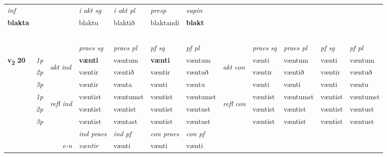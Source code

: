 \begin{longtable}[l]{X>{\footnotesize\itshape}llXXXXlXXXX}
   {\textit{inf}} & &  & \textit{i akt sg} & \textit{i akt pl}   & \textit{presp} & \textit{supin}   \\*
  {\textbf{blakta}} & && blaktu  & blaktið   & blaktandi &  \textbf{blakt}   \\*

\midrule
  & \\*
   & \\*
    & \\*
     & \\*
  & \\
   \midrule

 & &   & \textit{praes sg}  & \textit{praes pl}    & \textit{ pf sg} & \textit{pf pl} & & \textit{praes sg}  & \textit{praes pl}    & \textit{pf sg} & \textit{pf pl }  \\ \cmidrule{4-7} \cmidrule{9-12}
 \multirow{2}{*}{{{\textbf{v{\textsubscript{2}}} \Large{\textbf{20}}}}}  & 1p & \multirow{3}{*}{\begin{turn}{90}\textit{akt ind}\end{turn}} & \textbf{vænti} & væntum & \textbf{vænti} & væntum & \multirow{3}{*}{\begin{turn}{90}\textit{akt con}\end{turn}} &vænti & væntum & vænti & væntum\\*
 & 2p &  &  væntir  & væntið & væntir & væntuð & & væntir & væntið & væntir & væntuð \\*
 & 3p &  & væntir & vænta & vænti & væntu & & vænti & vænti& vænti & væntu \\*
\cmidrule{4-7} \cmidrule{9-12}
 & 1p & \multirow{3}{*}{\begin{turn}{90}\textit{refl ind}\end{turn}}  & væntist & væntumst & væntist & væntumst & \multirow{3}{*}{\begin{turn}{90}\textit{refl con}\end{turn}}  &væntist & væntumst & væntist & væntumst \\*
 & 2p &  & væntist & væntist & væntist & væntust & &væntist & væntist & væntist & væntust \\*
 & 3p  & & væntist & væntast & væntist & væntust & & væntist & væntist& væntist & væntust \\*
\cmidrule{4-7} \cmidrule{9-12}

   && &  \textit{ind praes} & \textit{ind pf} & \textit{con praes} & \textit{con pf} \\*
\multicolumn{3}{r}{\textit{e-n}} & væntir & vænti & vænti & vænti \\*


\end{longtable}
